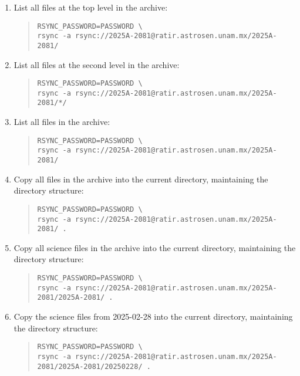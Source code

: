 \begin{enumerate}
\item
List all files at the top level in the archive:
\begin{quote}\footnotesize\begin{verbatim}
RSYNC_PASSWORD=PASSWORD \
rsync -a rsync://2025A-2081@ratir.astrosen.unam.mx/2025A-2081/
\end{verbatim}
\end{quote}

\item
List all files at the second level in the archive:
\begin{quote}\footnotesize\begin{verbatim}
RSYNC_PASSWORD=PASSWORD \
rsync -a rsync://2025A-2081@ratir.astrosen.unam.mx/2025A-2081/*/
\end{verbatim}
\end{quote}

\item
List all files in the archive:
\begin{quote}\footnotesize\begin{verbatim}
RSYNC_PASSWORD=PASSWORD \
rsync -a rsync://2025A-2081@ratir.astrosen.unam.mx/2025A-2081/
\end{verbatim}
\end{quote}

\item
Copy all files in the archive into the current directory, maintaining the directory structure:
\begin{quote}\footnotesize\begin{verbatim}
RSYNC_PASSWORD=PASSWORD \
rsync -a rsync://2025A-2081@ratir.astrosen.unam.mx/2025A-2081/ .
\end{verbatim}
\end{quote}

\item
Copy all science files in the archive into the current directory, maintaining the directory structure:
\begin{quote}\footnotesize\begin{verbatim}
RSYNC_PASSWORD=PASSWORD \
rsync -a rsync://2025A-2081@ratir.astrosen.unam.mx/2025A-2081/2025A-2081/ .
\end{verbatim}
\end{quote}

\item
Copy the science files from 2025-02-28 into the current directory, maintaining the directory structure:
\begin{quote}\footnotesize\begin{verbatim}
RSYNC_PASSWORD=PASSWORD \
rsync -a rsync://2025A-2081@ratir.astrosen.unam.mx/2025A-2081/2025A-2081/20250228/ .
\end{verbatim}
\end{quote}


\end{enumerate}
